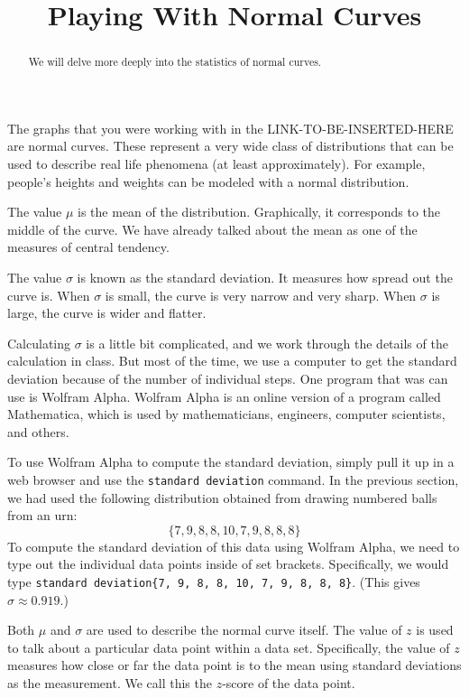\documentclass{ximera}
\title{Playing With Normal Curves}
\begin{document}
\begin{abstract}
We will delve more deeply into the statistics of normal curves.
\end{abstract}
\maketitle

The graphs that you were working with in the LINK-TO-BE-INSERTED-HERE are normal curves. These represent a very wide class of distributions that can be used to describe real life phenomena (at least approximately). For example, people's heights and weights can be modeled with a normal distribution.

The value $\mu$ is the mean of the distribution. Graphically, it corresponds to the middle of the curve. We have already talked about the mean as one of the measures of central tendency.

The value $\sigma$ is known as the standard deviation. It measures how spread out the curve is. When $\sigma$ is small, the curve is very narrow and very sharp. When $\sigma$ is large, the curve is wider and flatter.

Calculating $\sigma$ is a little bit complicated, and we work through the details of the calculation in class. But most of the time, we use a computer to get the standard deviation because of the number of individual steps. One program that was can use is Wolfram Alpha. Wolfram Alpha is an online version of a program called Mathematica, which is used by mathematicians, engineers, computer scientists, and others.

To use Wolfram Alpha to compute the standard deviation, simply pull it up in a web browser and use the \verb|standard deviation| command. In the previous section, we had used the following distribution obtained from drawing numbered balls from an urn:
\[ \{ 7, 9, 8, 8, 10, 7, 9, 8, 8, 8 \} \]
To compute the standard deviation of this data using Wolfram Alpha, we need to type out the individual data points inside of set brackets. Specifically, we would type \verb|standard deviation{7, 9, 8, 8, 10, 7, 9, 8, 8, 8}|. (This gives $\sigma \approx 0.919$.)

Both $\mu$ and $\sigma$ are used to describe the normal curve itself. The value of $z$ is used to talk about a particular data point within a data set. Specifically, the value of $z$ measures how close or far the data point is to the mean using standard deviations as the measurement. We call this the $z$-score of the data point.
\end{document}
